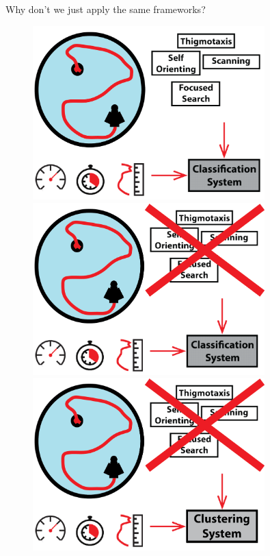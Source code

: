 \documentclass{beamer}
\begin{document}
{\begin{frame}{Why don't we just apply the same frameworks?}
\begin{figure}
	\begin{overprint}
		\centerline{\includegraphics[width=0.8\textwidth]{figures/othersX1}}
		\centerline{\includegraphics[width=0.8\textwidth]{figures/othersX2}}
		\centerline{\includegraphics[width=0.8\textwidth]{figures/othersX3}}
	\end{overprint}
\end{figure}		
\end{frame}

}
\end{document}
